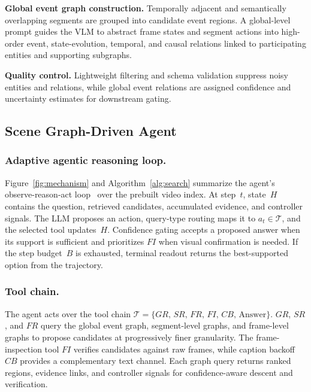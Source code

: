 \documentclass[letterpaper]{article} %
\begin{document}
\textbf{Global event graph construction.}
Temporally adjacent and semantically overlapping segments are grouped into candidate event regions.
A global-level prompt guides the VLM to abstract frame states and segment actions into high-order event, state-evolution, temporal, and causal relations linked to participating entities and supporting subgraphs.

\textbf{Quality control.}
Lightweight filtering and schema validation suppress noisy entities and relations, while global event relations are assigned confidence and uncertainty estimates for downstream gating.


\subsection{Scene Graph-Driven Agent}
\label{sec:agent}

\subsubsection{Adaptive agentic reasoning loop.}
Figure~\ref{fig:mechanism} and Algorithm~\ref{alg:search} summarize the agent's observe-reason-act loop~\cite{react2022} over the prebuilt video index.
At step~$t$, state~$H$ contains the question, retrieved candidates, accumulated evidence, and controller signals.
The LLM proposes an action, query-type routing maps it to $a_t \in \mathcal{T}$, and the selected tool updates~$H$.
Confidence gating accepts a proposed answer when its support is sufficient and prioritizes $FI$ when visual confirmation is needed.
If the step budget~$B$ is exhausted, terminal readout returns the best-supported option from the trajectory.

\subsubsection{Tool chain.}
The agent acts over the tool chain $\mathcal{T}=\{GR,\,\allowbreak SR,\,\allowbreak FR,\,\allowbreak FI,\,\allowbreak CB,\,\allowbreak \mathrm{Answer}\}$.
$GR$, $SR$, and $FR$ query the global event graph, segment-level graphs, and frame-level graphs to propose candidates at progressively finer granularity.
The frame-inspection tool $FI$ verifies candidates against raw frames, while caption backoff $CB$ provides a complementary text channel.
Each graph query returns ranked regions, evidence links, and controller signals for confidence-aware descent and verification.
\end{document}
